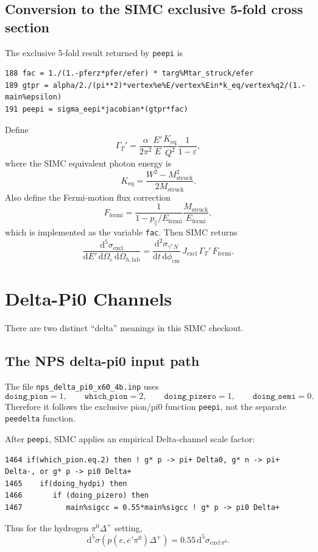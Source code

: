 \documentclass[11pt]{article}
\newcommand{\dd}{\mathrm{d}}
\newcommand{\eps}{\varepsilon}
\newcommand{\phicm}{\phi_{\mathrm{cm}}}
\newcommand{\Qsq}{Q^2}
\newcommand{\Ebeam}{E}
\newcommand{\Escat}{E'}
\begin{document}
\subsection{Conversion to the SIMC exclusive 5-fold cross section}

The exclusive 5-fold result returned by \texttt{peepi} is
\begin{lstlisting}
188 fac = 1./(1.-pferz*pfer/efer) * targ%Mtar_struck/efer
189 gtpr = alpha/2./(pi**2)*vertex%e%E/vertex%Ein*k_eq/vertex%q2/(1.-main%epsilon)
191 peepi = sigma_eepi*jacobian*(gtpr*fac)
\end{lstlisting}

Define
\[
  \Gamma_T'
  =
  \frac{\alpha}{2\pi^2}
  \frac{\Escat}{\Ebeam}
  \frac{K_{\mathrm{eq}}}{\Qsq}
  \frac{1}{1-\eps},
\]
where the SIMC equivalent photon energy is
\[
  K_{\mathrm{eq}}
  =
  \frac{W^2-M_{\mathrm{struck}}^2}{2M_{\mathrm{struck}}}.
\]
Also define the Fermi-motion flux correction
\[
  F_{\mathrm{fermi}}
  =
  \frac{1}{1-p_{\parallel}/E_{\mathrm{fermi}}}
  \frac{M_{\mathrm{struck}}}{E_{\mathrm{fermi}}},
\]
which is implemented as the variable \texttt{fac}.  Then SIMC returns
\[
  \boxed{
  \frac{\dd^5\sigma_{\mathrm{excl}}}
       {\dd \Escat\,\dd\Omega_e\,\dd\Omega_{h,\mathrm{lab}}}
  =
  \frac{\dd^2\sigma_{\gamma^*N}}
       {\dd t\,\dd\phicm}
  \,
  J_{\mathrm{excl}}
  \,
  \Gamma_T'
  \,
  F_{\mathrm{fermi}}
  }.
\]

\section{Delta-Pi0 Channels}

There are two distinct ``delta'' meanings in this SIMC checkout.

\subsection{The NPS delta-pi0 input path}

The file \texttt{nps\_delta\_pi0\_x60\_4b.inp} uses
\[
  \texttt{doing\_pion}=1,\qquad
  \texttt{which\_pion}=2,\qquad
  \texttt{doing\_pizero}=1,\qquad
  \texttt{doing\_semi}=0.
\]
Therefore it follows the exclusive pion/pi0 function \texttt{peepi}, not the
separate \texttt{peedelta} function.

After \texttt{peepi}, SIMC applies an empirical Delta-channel scale factor:
\begin{lstlisting}
1464 if(which_pion.eq.2) then ! g* p -> pi+ Delta0, g* n -> pi+ Delta-, or g* p -> pi0 Delta+
1465    if(doing_hydpi) then
1466       if (doing_pizero) then
1467          main%sigcc = 0.55*main%sigcc ! g* p -> pi0 Delta+
\end{lstlisting}
Thus for the hydrogen \(\pi^0\Delta^+\) setting,
\[
  \boxed{
  \dd^5\sigma(p(e,e'\pi^0)\Delta^+)
  =
  0.55\,
  \dd^5\sigma_{\mathrm{excl}\,\pi^0}
  }.
\]
\end{document}
